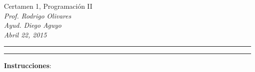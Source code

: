 \documentclass[10pt]{article}
\begin{document}
\begin{center}
    {\Large Certamen 1, Programaci\'on II} \\
    \emph{\small Prof. Rodrigo Olivares} \\
    \emph{\small Ayud. Diego Aguyo} \\
    \emph{\scriptsize Abril 22, 2015}
\end{center}
\vspace*{-35pt}
\begin{center}
    \rule{1\textwidth}{.3pt}
\end{center}
\vspace*{-42pt}
\begin{center}
    \rule{1\textwidth}{2pt}
\end{center}

\vspace*{-15pt}
{\small \textbf{Instrucciones}:}
\vspace*{-15pt}
\end{document}

